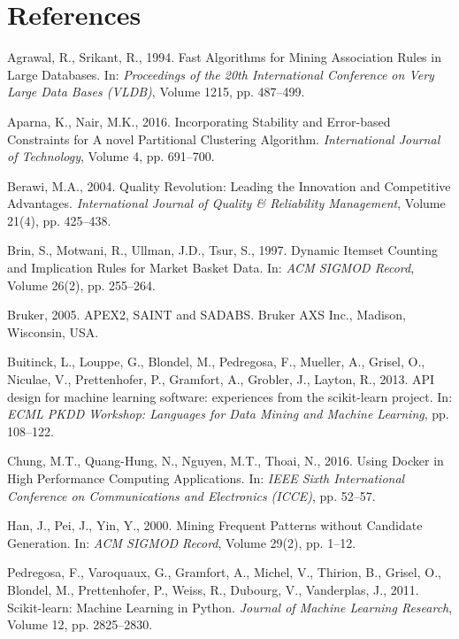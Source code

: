 \documentclass[11pt,a4paper]{article}
\begin{document}
\vspace{0.7em}

\section*{References}
\begin{description}
    \item Agrawal, R., Srikant, R., 1994. Fast Algorithms for Mining Association Rules in Large Databases. In: \textit{Proceedings of the 20th International Conference on Very Large Data Bases (VLDB)}, Volume 1215, pp. 487--499.
    \item Aparna, K., Nair, M.K., 2016. Incorporating Stability and Error-based Constraints for A novel Partitional Clustering Algorithm. \textit{International Journal of Technology}, Volume 4, pp. 691--700.
    \item Berawi, M.A., 2004. Quality Revolution: Leading the Innovation and Competitive Advantages. \textit{International Journal of Quality \& Reliability Management}, Volume 21(4), pp. 425--438.
    \item Brin, S., Motwani, R., Ullman, J.D., Tsur, S., 1997. Dynamic Itemset Counting and Implication Rules for Market Basket Data. In: \textit{ACM SIGMOD Record}, Volume 26(2), pp. 255--264.
    \item Bruker, 2005. APEX2, SAINT and SADABS. Bruker AXS Inc., Madison, Wisconsin, USA.
    \item Buitinck, L., Louppe, G., Blondel, M., Pedregosa, F., Mueller, A., Grisel, O., Niculae, V., Prettenhofer, P., Gramfort, A., Grobler, J., Layton, R., 2013. API design for machine learning software: experiences from the scikit-learn project. In: \textit{ECML PKDD Workshop: Languages for Data Mining and Machine Learning}, pp. 108--122.
    \item Chung, M.T., Quang-Hung, N., Nguyen, M.T., Thoai, N., 2016. Using Docker in High Performance Computing Applications. In: \textit{IEEE Sixth International Conference on Communications and Electronics (ICCE)}, pp. 52--57.
    \item Han, J., Pei, J., Yin, Y., 2000. Mining Frequent Patterns without Candidate Generation. In: \textit{ACM SIGMOD Record}, Volume 29(2), pp. 1--12.
    \item Pedregosa, F., Varoquaux, G., Gramfort, A., Michel, V., Thirion, B., Grisel, O., Blondel, M., Prettenhofer, P., Weiss, R., Dubourg, V., Vanderplas, J., 2011. Scikit-learn: Machine Learning in Python. \textit{Journal of Machine Learning Research}, Volume 12, pp. 2825--2830.

\end{description}
\end{document}
